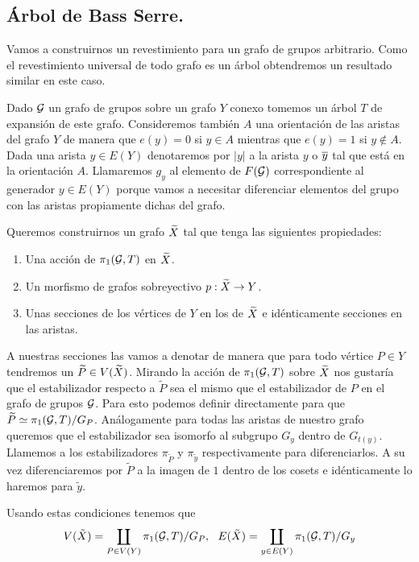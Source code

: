 \documentclass[tesis.tex]{subfiles}
\begin{document}
\subsection{Árbol de Bass Serre.}
Vamos a construirnos un revestimiento para un grafo de grupos arbitrario. 
Como el revestimiento universal de todo grafo es un árbol obtendremos un resultado similar en este caso.

Dado ${\cal G}$ un grafo de grupos sobre un grafo $Y$ conexo tomemos un árbol $T$ de expansión de este grafo.
Consideremos también $A$ una orientación de las aristas del grafo $Y$ de manera que $e(y)=0$ si $y \in A$ mientras que $e(y)=1$ si $y \notin A$.
Dada una arista $y \in E(Y)$ denotaremos por $|y|$ a la arista $y$ o $\overline{y}$ tal que está en la orientación $A$.
Llamaremos $g_y$ al elemento de $F({\cal G})$ correspondiente al generador $y \in E(Y)$ porque vamos a necesitar diferenciar elementos del grupo con las aristas propiamente dichas del grafo.

Queremos construirnos un grafo $\widetilde X$ tal que tenga las siguientes propiedades:

\begin{enumerate}
	\item Una acción de $\pi_1({\cal G}, T)$ en $\widetilde X$.
	\item Un morfismo de grafos sobreyectivo $p:\widetilde X \to Y$. 
	\item Unas secciones de los vértices de $Y$ en los de $\widetilde X$ e idénticamente secciones en las aristas.
\end{enumerate}

A nuestras secciones las vamos a denotar de manera que para todo vértice $P \in Y$ tendremos un $ \widetilde P \in V(\widetilde X)$.
Mirando la acción de $\pi_1({\cal G}, T)$ sobre $\widetilde X$ nos gustaría que el estabilizador respecto a $\widetilde P$ sea el mismo que el estabilizador de $P$ en el grafo de grupos ${\cal G}$. 
Para esto podemos definir directamente para que $\widetilde P \simeq \pi_1({\cal G}, T) / G_P$.
Análogamente para todas las aristas de nuestro grafo queremos que el estabilizador sea isomorfo al subgrupo $G_y$ dentro de $G_{t(y)}$.
Llamemos a los estabilizadores $\pi_{\widetilde P}$ y $\pi_{\widetilde y} $ respectivamente para diferenciarlos. 
A su vez diferenciaremos por $\widetilde P$ a la imagen de $1$ dentro de los cosets e idénticamente lo haremos para $\widetilde y$. 

Usando estas condiciones tenemos que
\begin{equation*}
	V(\tilde X) = \coprod_{P \in V(Y)} \pi_1({\cal G}, T) / G_P, \ \  E(\tilde X) = \coprod_{y \in E(Y)} \pi_1({\cal G}, T) / G_y
\end{equation*}
\end{document}
